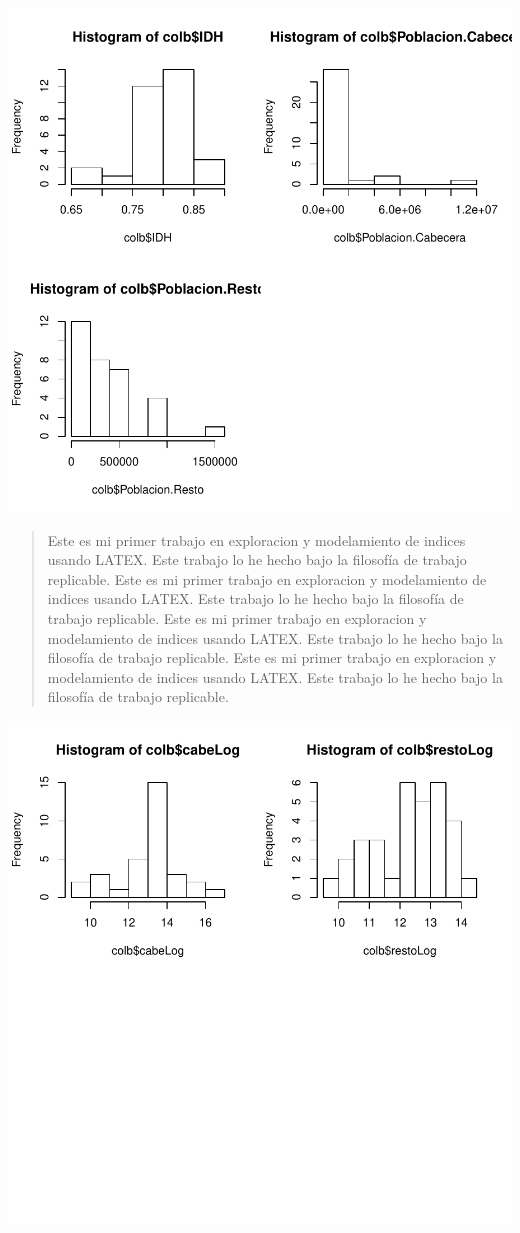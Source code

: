 \documentclass{article}
\begin{document}
\includegraphics{ProyectoFINAL-barplots}
\clearpage
\begin{abstract}
Este es mi primer trabajo en exploracion y modelamiento de indices usando LATEX. Este trabajo lo he hecho bajo la filosofía de trabajo replicable. Este es mi primer trabajo en exploracion y modelamiento de indices usando LATEX. Este trabajo lo he hecho bajo la filosofía de trabajo replicable. Este es mi primer trabajo en exploracion y modelamiento de indices usando LATEX. Este trabajo lo he hecho bajo la filosofía de trabajo replicable. Este es mi primer trabajo en exploracion y modelamiento de indices usando LATEX. Este trabajo lo he hecho bajo la filosofía de trabajo replicable.
\end{abstract}


\includegraphics{ProyectoFINAL-barplots2}
\clearpage
\end{document}
